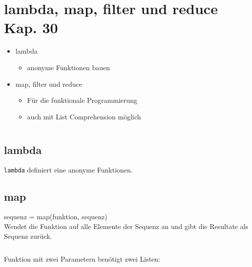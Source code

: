 \begin{minipage}[t]{0.49\textwidth}
	\section[lambda, map, filter und reduce]{lambda, map, filter und reduce \tiny{Kap. 30}}
	\begin{itemize}
		\item lambda
		\begin{itemize}
			\item anonyme Funktionen bauen
		\end{itemize}
		\item map, filter und reduce
		\begin{itemize}
			\item Für die funktionale Programmierung
			\item auch mit List Comprehension möglich
		\end{itemize}
	\end{itemize}
\end{minipage}
\begin{minipage}[t]{0.02\textwidth} $ \quad $\end{minipage}
\begin{minipage}[t]{0.49\textwidth}
	\subsection{lambda}
	\texttt{lambda} definiert eine anonyme Funktionen.
	
\end{minipage}


\subsection{map}
\begin{minipage}[t]{0.49\textwidth}
	sequenz = map(funktion, sequenz)\\
	Wendet die Funktion auf alle Elemente der Sequenz an und gibt die Resultate als Sequenz zurück.
	
\end{minipage}
\begin{minipage}[t]{0.02\textwidth} $ \quad $\end{minipage}
\begin{minipage}[t]{0.49\textwidth}
	Funktion mit zwei Parametern benötigt zwei Listen:
	
\end{minipage}

